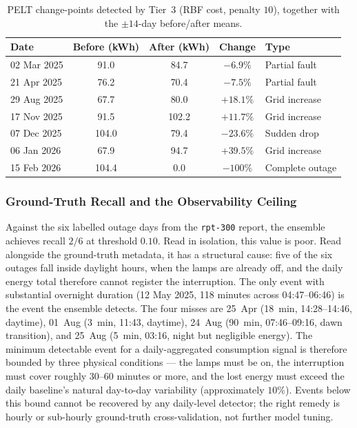 \documentclass{article}
\begin{document}
\begin{table}[H]
\centering
\small
\caption{PELT change-points detected by Tier~3 (RBF cost, penalty $10$), together with the $\pm14$-day before/after means.}
\label{tab:pelt_cps_main}
\begin{tabular}{lcccl}
\toprule
\textbf{Date} & \textbf{Before (kWh)} & \textbf{After (kWh)} & \textbf{Change} & \textbf{Type} \\
\midrule
02 Mar 2025 & 91.0  & 84.7  & $-6.9\%$   & Partial fault \\
21 Apr 2025 & 76.2  & 70.4  & $-7.5\%$   & Partial fault \\
29 Aug 2025 & 67.7  & 80.0  & $+18.1\%$  & Grid increase \\
17 Nov 2025 & 91.5  & 102.2 & $+11.7\%$  & Grid increase \\
07 Dec 2025 & 104.0 & 79.4  & $-23.6\%$  & Sudden drop \\
06 Jan 2026 & 67.9  & 94.7  & $+39.5\%$  & Grid increase \\
15 Feb 2026 & 104.4 & 0.0   & $-100\%$   & Complete outage \\
\bottomrule
\end{tabular}
\end{table}

\subsubsection{Ground-Truth Recall and the Observability Ceiling}

Against the six labelled outage days from the \texttt{rpt-300} report, the ensemble achieves recall $2/6$ at threshold $0.10$. Read in isolation, this value is poor. Read alongside the ground-truth metadata, it has a structural cause: five of the six outages fall inside daylight hours, when the lamps are already off, and the daily energy total therefore cannot register the interruption. The only event with substantial overnight duration (12 May 2025, 118 minutes across 04:47--06:46) is the event the ensemble detects. The four misses are 25~Apr (18~min, 14:28--14:46, daytime), 01~Aug (3~min, 11:43, daytime), 24~Aug (90~min, 07:46--09:16, dawn transition), and 25~Aug (5~min, 03:16, night but negligible energy). The minimum detectable event for a daily-aggregated consumption signal is therefore bounded by three physical conditions --- the lamps must be on, the interruption must cover roughly 30--60 minutes or more, and the lost energy must exceed the daily baseline's natural day-to-day variability (approximately $10\%$). Events below this bound cannot be recovered by any daily-level detector; the right remedy is hourly or sub-hourly ground-truth cross-validation, not further model tuning.
\end{document}
